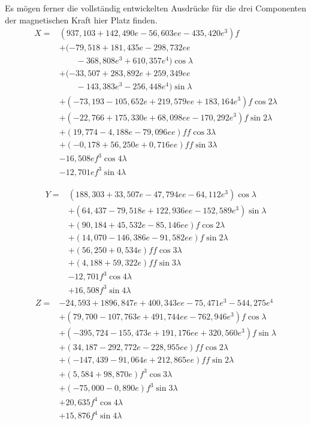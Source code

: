 Es mögen ferner die vollständig entwickelten Ausdrücke für die drei Componenten der magnetischen Kraft hier Platz finden.
\[
\begin{aligned}
X={}&(937{,}103+142{,}490e-56{,}603ee-435{,}420e^3)f\\
&+(-79{,}518+181{,}435e-298{,}732ee\\
&\qquad-368{,}808e^3+610{,}357e^4)\cos\lambda\\
&+(-33{,}507+283{,}892e+259{,}349ee\\
&\qquad-143{,}383e^3-256{,}448e^4)\sin\lambda\\
&+(-73{,}193-105{,}652e+219{,}579ee+183{,}164e^3)f\cos2\lambda\\
&+(-22{,}766+175{,}330e+68{,}098ee-170{,}292e^3)f\sin2\lambda\\
&+(19{,}774-4{,}188e-79{,}096ee)ff\cos3\lambda\\
&+(-0{,}178+56{,}250e+0{,}716ee)ff\sin3\lambda\\
&-16{,}508ef^3\cos4\lambda\\
&-12{,}701ef^3\sin4\lambda
\end{aligned}
\]
\par\clearpage
{}
\[
\begin{aligned}
Y={}&(188{,}303+33{,}507e-47{,}794ee-64{,}112e^3)\cos\lambda\\
&+(64{,}437-79{,}518e+122{,}936ee-152{,}589e^3)\sin\lambda\\
&+(90{,}184+45{,}532e-85{,}146ee)f\cos2\lambda\\
&+(14{,}070-146{,}386e-91{,}582ee)f\sin2\lambda\\
&+(56{,}250+0{,}534e)ff\cos3\lambda\\
&+(4{,}188+59{,}322e)ff\sin3\lambda\\
&-12{,}701f^3\cos4\lambda\\
&+16{,}508f^3\sin4\lambda
\end{aligned}
\]
\[
\begin{aligned}
Z={}&-24{,}593+1896{,}847e+400{,}343ee-75{,}471e^3-544{,}275e^4\\
&+(79{,}700-107{,}763e+491{,}744ee-762{,}946e^3)f\cos\lambda\\
&+(-395{,}724-155{,}473e+191{,}176ee+320{,}560e^3)f\sin\lambda\\
&+(34{,}187-292{,}772e-228{,}955ee)ff\cos2\lambda\\
&+(-147{,}439-91{,}064e+212{,}865ee)ff\sin2\lambda\\
&+(5{,}584+98{,}870e)f^3\cos3\lambda\\
&+(-75{,}000-0{,}890e)f^3\sin3\lambda\\
&+20{,}635f^4\cos4\lambda\\
&+15{,}876f^4\sin4\lambda
\end{aligned}
\]

